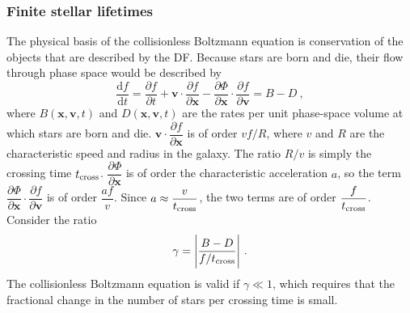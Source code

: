 \documentclass[12pt,a4paper]{article}
\renewcommand{\vec}[1]{\boldsymbol{#1}}
\newcommand{\dif}{\mathrm{d}}
\begin{document}
\subsubsection{Finite stellar lifetimes}
The physical basis of the collisionless Boltzmann equation is conservation of the objects that are described by the DF. Because stars are born and die, their flow through phase space would be described by
\begin{equation}
\frac{\dif f}{\dif t} = \frac{\partial f}{\partial t} +\vec{v} \cdot \frac{\partial f}{\partial \vec{x}} -\frac{\partial \Phi}{\partial \vec{x}}\cdot \frac{\partial f}{\partial \vec{v}} = B -D ~,
\end{equation}
where $B(\vec{x}, \vec{v}, t)$ and $D(\vec{x}, \vec{v}, t)$ are the rates per unit phase-space volume at which stars are born and die. $\vec{v} \cdot \dfrac{\partial f}{\partial \vec{x}}$ is of order $vf/R$, where $v$ and $R$ are the characteristic speed and radius in the galaxy. The ratio $R/v$ is simply the crossing time $t_{\rm cross}$. $\dfrac{\partial \Phi}{\partial \vec{x}}$ is of order the characteristic acceleration $a$, so the term $\dfrac{\partial \Phi}{\partial \vec{x}}\cdot \dfrac{\partial f}{\partial \vec{v}}$ is of order $\dfrac{af}{v}$. Since $a \approx \dfrac{v}{t_{\rm cross}}$, the two terms are of order $\dfrac{f}{t_{\rm cross}}$. Consider the ratio
\begin{equation}
\gamma = \Bigg| \frac{B-D}{f/t_{\rm cross}} \Bigg| ~.
\end{equation}
The collisionless Boltzmann equation is valid if $\gamma \ll 1$, which requires that the fractional change in the number of stars per crossing time is small.
\end{document}
